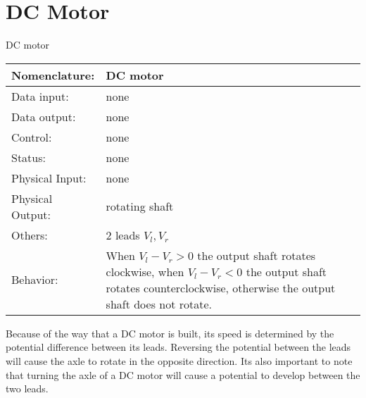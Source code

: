                             \section{DC Motor}
                            \label{page:dvmotor}
                            \begin{buildingblock}{DC motor}
                                \begin{tabular}{|l|p{3.5in}|} \hline
                                    Nomenclature:  & DC motor  \\ \hline
                                    Data input:    & none    \\ \hline
                                    Data output:   & none     \\ \hline
                                    Control:       & none     \\ \hline
                                    Status:        & none      \\ \hline
                                    Physical Input:& none        \\ \hline
                                    Physical Output:& rotating shaft        \\ \hline
                                    Others:        & 2 leads $V_l, V_r$      \\ \hline
                                    Behavior:      & When $V_l-V_r > 0$ the output shaft rotates clockwise,
                                    when $V_l-V_r < 0$ the output shaft rotates counterclockwise, otherwise the
                                    output shaft does not rotate. \\ \hline
                                \end{tabular}
                            \end{buildingblock}

                            Because of the way that a DC motor is built, its speed is determined
                            by the potential difference between its leads.  Reversing the
                            potential between the leads will cause the axle to rotate
                            in the opposite direction.  Its also
                            important to note that turning the axle of a DC motor will
                            cause a potential to develop between the two leads.

